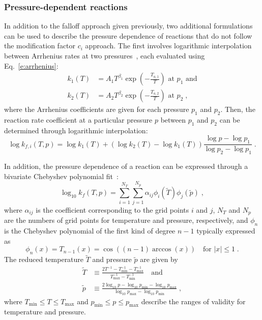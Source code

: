 \documentclass[preprint,12pt]{elsarticle}
\begin{document}
\subsubsection{Pressure-dependent reactions}

In addition to the falloff approach given previously, two additional formulations can be used to describe the pressure dependence of reactions that do not follow the modification factor $c_i$ approach.
The first involves logarithmic interpolation between Arrhenius rates at two pressures~\cite{chemkin:2012,Goodwin:2015aa}, each evaluated using Eq.~\eqref{e:arrhenius}:
\begin{align}
k_1 (T) &= A_1 T^{\beta_1} \exp \left( -\frac{T_{a, 1}}{T} \right) \text{ at } p_1 \text{ and} \label{e:plog_k1} \\
k_2 (T) &= A_2 T^{\beta_2} \exp \left( -\frac{T_{a, 2}}{T} \right) \text{ at } p_2 \;, \label{e:plog_k2}
\end{align}
where the Arrhenius coefficients are given for each pressure $p_1$ and $p_2$.
Then, the reaction rate coefficient at a particular pressure $p$ between $p_1$ and $p_2$ can be determined through logarithmic interpolation:
\begin{equation}
\log k_{f,i}(T, p) = \log k_1 (T) + \left( \log k_2 (T) - \log k_1 (T) \right) \frac{\log p - \log p_1}{\log p_2 - \log p_1} \;. \label{e:plog}
\end{equation}

In addition, the pressure dependence of a reaction can be expressed through a bivariate Chebyshev polynomial fit~\cite{Venkatesh:1997hv,Venkatesh:1997ik,Venkatesh:2000gj,chemkin:2012,Goodwin:2015aa}:
\begin{equation}
\log_{10} k_{f}(T, p) = \sum_{i = 1}^{N_T} \sum_{j = 1}^{N_p} \alpha_{ij} \phi_i (\tilde{T}) \phi_j \left(\tilde{p}\right) \label{e:cheb} \;,
\end{equation}
where $\alpha_{ij}$ is the coefficient corresponding to the grid points $i$ and $j$, $N_T$ and $N_p$ are the numbers of grid points for temperature and pressure, respectively, and $\phi_n$ is the Chebyshev polynomial of the first kind of degree $n - 1$ typically expressed as
\begin{equation}
\phi_n (x) = T_{n-1} (x) = \cos \left( (n - 1) \arccos (x) \right) \quad \text{for } |x| \leq 1 \;.
\end{equation}
The reduced temperature $\tilde{T}$ and pressure $\tilde{p}$ are given by
\begin{align}
\tilde{T} &\equiv \frac{2 T^{-1} - T^{-1}_{\min} - T^{-1}_{\max}}{T^{-1}_{\max} - T^{-1}_{\min}} \quad\text{and} \\
\tilde{p} &\equiv \frac{2\log_{10} p - \log_{10} p_{\min} - \log_{10} p_{\max}}{\log_{10} p_{\max} - \log_{10} p_{\min}} \;,
\end{align}
where $T_{\min} \leq T \leq T_{\max}$ and $p_{\min} \leq p \leq p_{\max}$ describe the ranges of validity for temperature and pressure.
\end{document}

